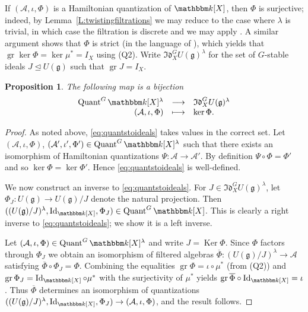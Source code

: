 \documentclass[twoside,12pt,reqno]{amsart}
\newtheorem{Proposition}[Theorem]{Proposition}
\theoremstyle{remark}
\numberwithin{equation}{section}
\def\bar{\overline}
\def\k{{\mathbbm k}}
\def\Ker{\operatorname{Ker}}
\def\gr{\operatorname{gr}}
\def\Quant{\operatorname{Quant}}
\def\Id{\operatorname{Id}}
\def\o{\overline}
\def\g{{\mathfrak g}}
\def\Idl{\mathfrak{Id}}
\newcommand{\A}{\mathcal{A}}
\begin{document}
If $(\A, \iota, \Phi)$ is a Hamiltonian quantization of $\k[X]$, then $\Phi$ is surjective; indeed, by Lemma~\ref{L:twistingfiltrations} we may reduce to the case where $\lambda$ is trivial, in which case the filtration is discrete and we may apply \cite[Corollary 6.14]{MR}. A similar argument shows that $\Phi$ is strict (in the language of \cite{MR}), which yields that $\gr \ker \Phi = \ker \mu^* = I_X$ using (Q2). Write $\Idl_X^G U(\g)^\lambda$ for the set of $G$-stable ideals $J \unlhd U(\g)$ such that $\gr J = I_X$.

\begin{Proposition}
\label{P:quantizationsvsideals}
The following map is a bijection
    \begin{eqnarray}
    \label{eq:quantstoideals}
        \begin{array}{rcl}
        \Quant^G \k[X]^\lambda & \longrightarrow & \Idl_X^G U(\g)^\lambda\\
        (\A, \iota, \Phi) & \longmapsto & \ker \Phi.
        \end{array}
    \end{eqnarray}
\end{Proposition}
\begin{proof}
As noted above, \eqref{eq:quantstoideals} takes values in the correct set. Let $(\A, \iota, \Phi)$, $(\A', \iota', \Phi')\in\Quant^G  \k[X]^\lambda$ such that there exists an isomorphism of Hamiltonian quantizations $\Psi : \A \to \A'$. By definition $\Psi\circ\Phi=\Phi'$ and so $\ker\Phi=\ker\Phi'$. Hence \eqref{eq:quantstoideals} is well-defined.

We now construct an inverse to \eqref{eq:quantstoideals}. For $J\in \Idl_X^G U(\g)^\lambda$, let $\Phi_J:U(\g)\to U(\g)/J$ denote the natural projection. Then $((U(\g)/J)^\lambda,\Id_{\k[X]},\Phi_J)\in\Quant^G \k[X]$. This is clearly a right inverse to \eqref{eq:quantstoideals}; we show it is a left inverse.

Let $(\A, \iota, \Phi)\in\Quant^G  \k[X]^\lambda$ and write $J = \Ker \Phi$.  
Since $\Phi$ factors through $\Phi_J$ we obtain an isomorphism of filtered algebras $\bar\Phi : (U(\g) / J)^\lambda \to \A$ satisfying $ \overline{\Phi} \circ \Phi_J=\Phi$.
Combining the equalities $\gr\Phi=\iota\circ\mu^*$ (from (Q2)) and $\gr\Phi_J=\Id_{\k[X]}\circ \mu^*$ with the surjectivity of $\mu^*$ yields $\gr\o\Phi\circ\Id_{\k[X]}=\iota$. Thus $\bar\Phi$ determines an isomorphism of quantizations $((U(\g) / J)^\lambda, \Id_{\k[X]}, \Phi_J) \to (\A, \iota, \Phi)$, and the result follows.
\end{proof} 
\end{document}
